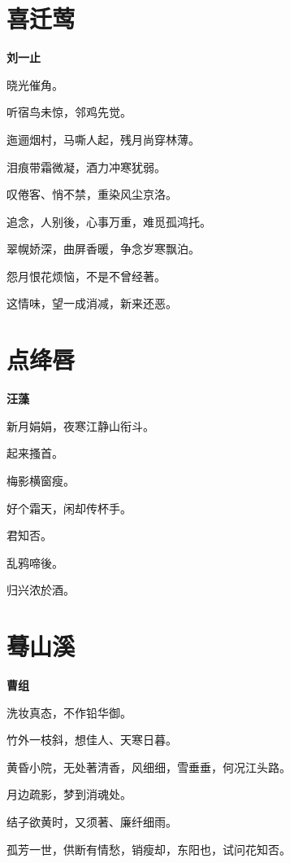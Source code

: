 \documentclass[12pt,a4paper]{ctexbook}
\begin{document}
\section{喜迁莺}
\textbf{刘一止}\par\vspace{0.5em}
晓光催角。\par
听宿鸟未惊，邻鸡先觉。\par
迤逦烟村，马嘶人起，残月尚穿林薄。\par
泪痕带霜微凝，酒力冲寒犹弱。\par
叹倦客、悄不禁，重染风尘京洛。\par
追念，人别後，心事万重，难觅孤鸿托。\par
翠幌娇深，曲屏香暖，争念岁寒飘泊。\par
怨月恨花烦恼，不是不曾经著。\par
这情味，望一成消减，新来还恶。\par

\section{点绛唇}
\textbf{汪藻}\par\vspace{0.5em}
新月娟娟，夜寒江静山衔斗。\par
起来搔首。\par
梅影横窗瘦。\par
好个霜天，闲却传杯手。\par
君知否。\par
乱鸦啼後。\par
归兴浓於酒。\par

\section{蓦山溪}
\textbf{曹组}\par\vspace{0.5em}
洗妆真态，不作铅华御。\par
竹外一枝斜，想佳人、天寒日暮。\par
黄昏小院，无处著清香，风细细，雪垂垂，何况江头路。\par
月边疏影，梦到消魂处。\par
结子欲黄时，又须著、廉纤细雨。\par
孤芳一世，供断有情愁，销瘦却，东阳也，试问花知否。\par
\end{document}

